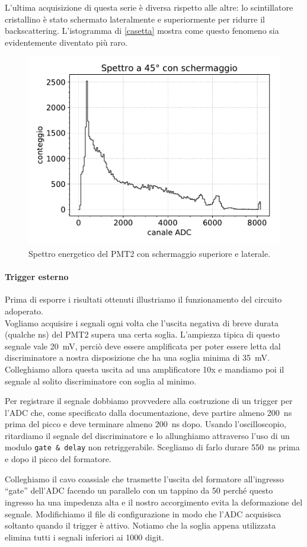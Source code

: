L'ultima acquisizione di questa serie è diversa rispetto alle altre: lo scintillatore cristallino è stato schermato lateralmente e superiormente per ridurre il backscattering. L'istogramma di \autoref{casetta} mostra come questo fenomeno sia evidentemente diventato più raro.

\begin{figure}
\centering
\includegraphics[width=25 em]{45gs}
\caption{Spettro energetico del PMT2 con schermaggio superiore e laterale.}
\label{casetta}
\end{figure}

\paragraph{Trigger esterno} Prima di esporre i risultati ottenuti illustriamo il funzionamento del circuito adoperato.\\
Vogliamo acquisire i segnali ogni volta che l'uscita negativa di breve durata (qualche \si{ns}) del PMT2 supera una certa soglia. L'ampiezza tipica di questo segnale vale \SI{20}{mV}, perciò deve essere amplificata per poter essere letta dal discriminatore a nostra disposizione che ha una soglia minima di \SI{35}{mV}. Colleghiamo allora questa uscita ad una amplificatore 10x 
e mandiamo poi il segnale al solito discriminatore con soglia al minimo.

Per registrare il segnale dobbiamo provvedere alla costruzione di un trigger per l'ADC che, come specificato dalla documentazione, deve partire almeno \SI{200}{ns} prima del picco e deve terminare almeno \SI{200}{ns} dopo. Usando l'oscilloscopio, ritardiamo il segnale del discriminatore e lo allunghiamo attraverso l'uso di un modulo \texttt{gate \& delay} non retriggerabile. Scegliamo di farlo durare \SI{550}{ns} prima e dopo il picco del formatore.

Colleghiamo il cavo coassiale che trasmette l'uscita del formatore all'ingresso ``gate'' dell'ADC facendo un parallelo con un tappino da \SI{50}{\Omega} perché questo ingresso ha una impedenza alta e il nostro accorgimento evita la deformazione del segnale.
Modifichiamo il file di configurazione in modo che l'ADC acquisisca soltanto quando il trigger è attivo. Notiamo che la soglia appena utilizzata elimina tutti i segnali inferiori ai 1000 digit.
